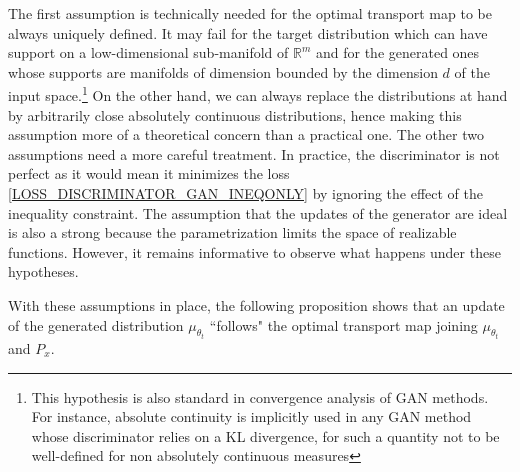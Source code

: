 \documentclass[runningheads]{llncs}
\begin{document}
The first assumption is technically needed for the optimal transport map to be always uniquely defined. It may fail for the target distribution which can have support on a low-dimensional sub-manifold of $\mathds{R}^m$ and for the generated ones whose supports are manifolds of dimension bounded by the dimension $d$ of the input space.\footnote{This hypothesis is also standard in convergence analysis of GAN methods\citep{nagarajan2017gradient}. For instance, absolute continuity is implicitly used in any GAN method whose discriminator relies on a KL divergence, for such a quantity not to be well-defined for non absolutely continuous measures} On the other hand, we can always replace the distributions at hand by arbitrarily close absolutely continuous distributions, hence making this assumption more of a theoretical concern than a practical one. The other two assumptions need a more careful treatment. In practice, the discriminator is not perfect as it would mean it minimizes the loss \eqref{LOSS_DISCRIMINATOR_GAN_INEQONLY} by ignoring the effect of the inequality constraint. The assumption that the updates of the generator are ideal is also a strong because the parametrization limits the space of realizable functions. However, it remains informative to observe what happens under these hypotheses. 

With these assumptions in place, the following proposition shows that an update of the generated distribution $\mu_{\theta_t}$ ``follows" the optimal transport map joining $\mu_{\theta_t}$ and $P_x$.
\end{document}
